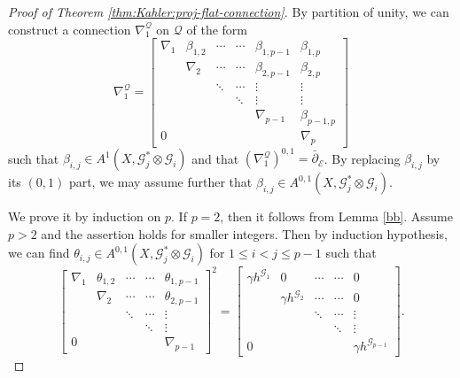 \documentclass[english,reqno]{amsart}
\newcommand\sE{{\mathscr E}}
\newcommand\sG{{\mathscr G}}
\newcommand\sQ{{\mathscr Q}}
\newcommand\bp{{\bar\partial}}
\theoremstyle{plain}
\theoremstyle{definition}
\numberwithin{equation}{section} %
\begin{document}
\begin{proof}[Proof of Theorem \ref{thm:Kahler:proj-flat-connection}]
\noindent
    By partition of unity, we can construct a connection $\nabla^{\sQ}_1$ on $\sQ$ of the form
    \[
    \nabla^{\sQ}_1 =
    \begin{bmatrix}
    \nabla_1 & \beta_{1,2} & \cdots & \cdots & \beta_{1,p-1} & \beta_{1,p} \\
    & \nabla_2  & \cdots & \cdots& \beta_{2,p-1} & \beta_{2,p} \\
    & &\ddots & \cdots & \vdots & \vdots \\
    & & & \ddots & \vdots & \vdots \\
    & & & & \nabla_{p-1} & \beta_{p-1,p} \\
    0 & & & & & \nabla_p
    \end{bmatrix}
    \]
    such that  $\beta_{i,j} \in A^{1}(X,\sG_j^* \otimes \sG_i)$ and that $(\nabla^{\sQ}_1)^{0,1}=\bp_{\sE}$.  By replacing $\beta_{i,j}$ by its $(0,1)$ part, we may assume further that $\beta_{i,j} \in A^{0,1}(X,\sG_j^* \otimes \sG_i)$.

    We  prove it by induction on $p$. If $p=2$, then it follows from Lemma \ref{bb}.
    Assume  $p>2$ and the assertion holds for smaller integers.
    Then by induction hypothesis, we can find $\theta_{i,j} \in A^{0,1}(X,\sG_j^* \otimes \sG_i)$ for $1\leqslant i<j\leqslant p-1$  such that
    \[
    \begin{bmatrix}
    \nabla_1 & \theta_{1,2} & \cdots & \cdots & \theta_{1,p-1} \\
    &\nabla_2  & \cdots & \cdots& \theta_{2,p-1}  \\
    & & \ddots & \cdots & \vdots  \\
    & & & \ddots & \vdots  \\
    0 & & & & \nabla_{p-1}
    \end{bmatrix}^2
    =
    \begin{bmatrix}
    \gamma h^{\sG_1} &  0 & \cdots & \cdots & 0 \\
    & \gamma h^{\sG_2} & \cdots & \cdots& 0  \\
    & &\ddots & \cdots & \vdots  \\
    & & & \ddots & \vdots  \\
    0 & & & &  \gamma h^{\sG_{p-1}}
    \end{bmatrix}.
    \]


\end{proof}
\end{document}

